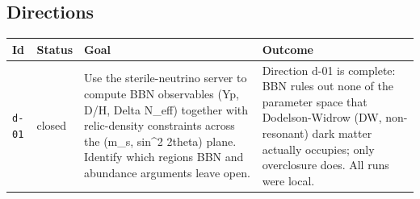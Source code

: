 \documentclass[11pt,a4paper]{article}
\begin{document}
\subsection{Directions}
\begin{longtable}{@{}p{}p{}p{}p{}@{}}
\toprule Id & Status & Goal & Outcome \\ \midrule \endhead
\texttt{d-01} & closed & Use the sterile-neutrino server to compute BBN observables (Yp, D/H, Delta N\_eff) together with relic-density constraints across the (m\_s, sin\textasciicircum{}2 2theta) plane. Identify which regions BBN and abundance arguments leave open. & Direction d-01 is complete: BBN rules out none of the parameter space that Dodelson-Widrow (DW, non-resonant) dark matter actually occupies; only overclosure does. All runs were local.


\end{longtable}
\end{document}
